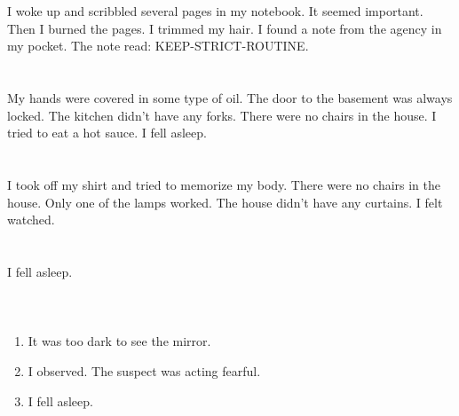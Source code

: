 \documentclass{article}
\begin{document}
    \section{}
    I woke up and scribbled several pages in my notebook. It seemed important. Then I burned the pages. I trimmed my hair. I found a note from the agency in my pocket. The note read: KEEP-STRICT-ROUTINE.  
    \newpage
    
    \section{}
    My hands were covered in some type of oil. The door to the basement was always locked. The kitchen didn't have any forks. There were no chairs in the house. I tried to eat a hot sauce. I fell asleep.  
    \newpage
    
    \section{}
    I took off my shirt and tried to memorize my body. There were no chairs in the house. Only one of the lamps worked. The house didn't have any curtains. I felt watched.  
    \newpage
    
    \section{}
    I fell asleep.\\\\ 
    \newpage
    
    \section{}
    
    \begin{enumerate}
    
    \item It was too dark to see the mirror.\\
    
    \item I observed. The suspect was acting fearful.\\
    
    \item I fell asleep.\\
    
    \end{enumerate}
     
    \newpage
    
\end{document}

